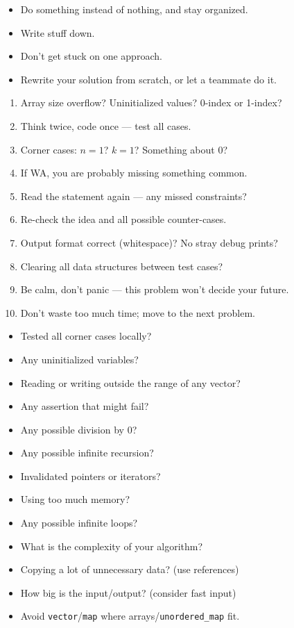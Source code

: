 
\begin{itemize}
\item Do something instead of nothing, and stay organized.
\item Write stuff down.
\item Don't get stuck on one approach.
\item Rewrite your solution from scratch, or let a teammate do it.
\end{itemize}

\begin{enumerate}
\item Array size overflow? Uninitialized values? 0-index or 1-index?
\item Think twice, code once --- test all cases.
\item Corner cases: $n=1$? $k=1$? Something about $0$?
\item If WA, you are probably missing something common.
\item Read the statement again --- any missed constraints?
\item Re-check the idea and all possible counter-cases.
\item Output format correct (whitespace)? No stray debug prints?
\item Clearing all data structures between test cases?
\item Be calm, don't panic --- this problem won't decide your future.
\item Don't waste too much time; move to the next problem.
\end{enumerate}

\begin{itemize}
\item Tested all corner cases locally?
\item Any uninitialized variables?
\item Reading or writing outside the range of any vector?
\item Any assertion that might fail?
\item Any possible division by $0$?
\item Any possible infinite recursion?
\item Invalidated pointers or iterators?
\item Using too much memory?
\end{itemize}

\begin{itemize}
\item Any possible infinite loops?
\item What is the complexity of your algorithm?
\item Copying a lot of unnecessary data? (use references)
\item How big is the input/output? (consider fast input)
\item Avoid \texttt{vector}/\texttt{map} where arrays/\texttt{unordered\_map} fit.
\end{itemize}

